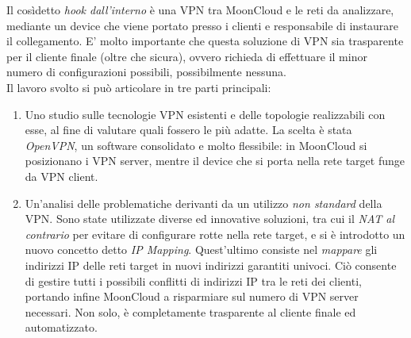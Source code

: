 \documentclass[10pt,a4paper]{article}
\begin{document}
        Il cosìdetto \textit{hook dall'interno} è una VPN tra
        MoonCloud e le reti da analizzare, mediante un device che viene portato presso i clienti
        e responsabile di instaurare il collegamento. E' molto importante che questa soluzione
        di VPN
        sia trasparente per il cliente finale (oltre che sicura), ovvero richieda di
        effettuare il minor numero di configurazioni possibili, possibilmente nessuna.\\
        Il lavoro svolto si può articolare in tre parti principali:
        \begin{enumerate}
            \item Uno studio sulle tecnologie VPN esistenti e delle topologie realizzabili
            con esse, al fine di valutare quali
            fossero le più adatte. La scelta è stata \textit{OpenVPN},
            un software consolidato e molto flessibile: in MoonCloud si posizionano
            i VPN server, mentre il device che si porta nella rete target funge da
            VPN client.
            \item Un'analisi delle problematiche derivanti da un utilizzo
            \textit{non standard} della VPN. Sono state utilizzate diverse ed
            innovative soluzioni, tra cui il \textit{NAT al contrario} per evitare
            di configurare rotte nella rete target, e si è introdotto un nuovo
            concetto detto \textit{IP Mapping}. Quest'ultimo consiste nel
            \textit{mappare} gli indirizzi IP delle reti target in nuovi
            indirizzi garantiti univoci. Ciò consente
            di gestire tutti i possibili conflitti di indirizzi IP tra le reti
            dei clienti, portando infine MoonCloud a risparmiare sul numero
            di VPN server necessari. Non solo, è completamente trasparente
            al cliente finale ed automatizzato.

\end{enumerate}
\end{document}
